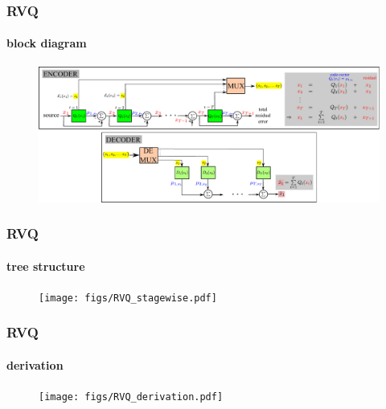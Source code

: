 \begin{frame}[plain]
\frametitle{RVQ}
\framesubtitle{block diagram}
\logoCSIPCPL\mypagenum
	\begin{changemargin}{-1.3in}{0in}
		\begin{figure}				
			\includegraphics[width=1.3\textwidth]{figs/RVQ_blockDiagram.pdf}
		\end{figure}
	\end{changemargin}
\end{frame}





\begin{frame}
\frametitle{RVQ}
\framesubtitle{tree structure}
\logoCSIPCPL\mypagenum
	\begin{figure}				
		\texttt{[image: figs/RVQ\_stagewise.pdf]}
	\end{figure}
\end{frame}




\begin{frame}[plain]
\frametitle{RVQ}
\framesubtitle{derivation}
\logoCSIPCPL\mypagenum
	\begin{changemargin}{-1.3in}{0in}
		\begin{figure}				
			\texttt{[image: figs/RVQ\_derivation.pdf]}
		\end{figure}
	\end{changemargin}
\end{frame}


